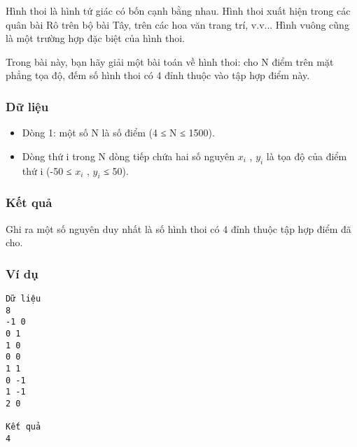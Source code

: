 



   Hình thoi là hình tứ giác có bốn cạnh bằng nhau. Hình thoi   xuất hiện trong các quân bài Rô trên bộ bài Tây, trên các hoa   văn trang trí, v.v... Hình vuông cũng là một trường hợp đặc biệt của hình thoi.  

   Trong bài này, bạn hãy giải một bài toán về hình thoi: cho   N điểm trên mặt phẳng tọa độ, đếm số hình thoi có 4 đỉnh   thuộc vào tập hợp điểm này.  

\subsubsection{   Dữ liệu  }
\begin{itemize}
	\item     Dòng 1: một số N là số điểm (4 ≤ N ≤ 1500).   
	\item     Dòng thứ i trong N dòng tiếp chứa hai số nguyên   $x_{i}$    , $y_{i}$    là tọa độ của điểm thứ i (-50   ≤ $x_{i}$    , $y_{i}$    ≤ 50).   
\end{itemize}

\subsubsection{   Kết quả  }

   Ghi ra một số nguyên duy nhất là số hình thoi có 4 đỉnh   thuộc tập hợp điểm đã cho.  

\subsubsection{   Ví dụ  }
\begin{verbatim}
Dữ liệu
8
-1 0
0 1
1 0
0 0
1 1
0 -1
1 -1
2 0

Kết quả
4
\end{verbatim}
